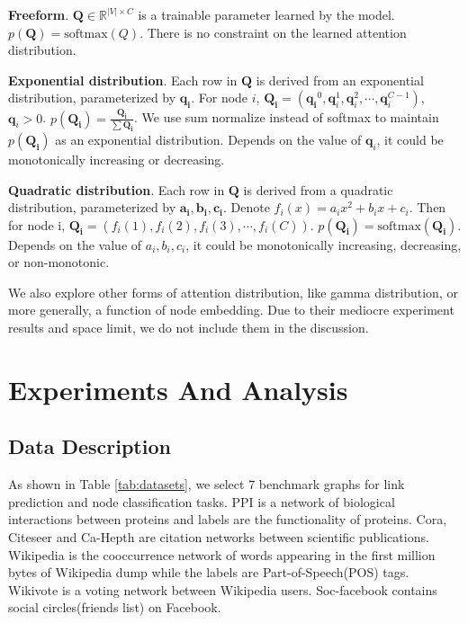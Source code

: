 \documentclass{article}
\begin{document}
\textbf{Freeform}.
$\mathbf{Q} \in \mathbb{R}^{|V|\times{C}}$ is a trainable parameter learned by the model. $p(\mathbf{Q}) = \text{softmax}(Q)$. There is no constraint on the learned attention distribution.

\textbf{Exponential distribution}.
Each row in $\mathbf{Q}$ is derived from an exponential distribution, parameterized by $\mathbf{q_i}$. For node $i$, $\mathbf{Q_i} = (\mathbf{q_i}^0, \mathbf{q}_i^1, \mathbf{q}_i^2, \cdots, \mathbf{q}_i^{C-1})$, $\mathbf{q}_i>0$. $p(\mathbf{Q_i}) = \frac{\mathbf{Q_i}}{\sum \mathbf{Q_i}}$. We use sum normalize instead of softmax to maintain $p(\mathbf{Q_i})$ as an exponential distribution. Depends on the value of $\mathbf{q}_i$, it could be monotonically increasing or decreasing.

\textbf{Quadratic distribution}.
Each row in $\mathbf{Q}$ is derived from a quadratic distribution, parameterized by $\mathbf{a_i, b_i, c_i}$. Denote $f_i(x) = a_ix^2+b_ix+c_i$. Then for node i, $\mathbf{Q_i} = (f_i(1), f_i(2), f_i(3), \cdots, f_i(C))$. $p(\mathbf{Q_i}) = \text{softmax}(\mathbf{Q_i})$. Depends on the value of $a_i, b_i, c_i$, it could be monotonically increasing, decreasing, or non-monotonic.

We also explore other forms of attention distribution, like gamma distribution, or more generally, a function of node embedding. Due to their mediocre experiment results and space limit, we do not include them in the discussion.

\section{Experiments And Analysis}
\subsection{Data Description}
As shown in Table \ref{tab:datasets}, we select 7 benchmark graphs for link prediction and node classification tasks. PPI is a network of biological interactions between proteins and labels are the functionality of proteins. Cora, Citeseer and Ca-Hepth are citation networks between scientific publications. Wikipedia is the cooccurrence network of words appearing in the first million bytes of Wikipedia dump while the labels are Part-of-Speech(POS) tags. Wikivote is a voting network between Wikipedia users. Soc-facebook contains social circles(friends list) on Facebook. 
\end{document}
